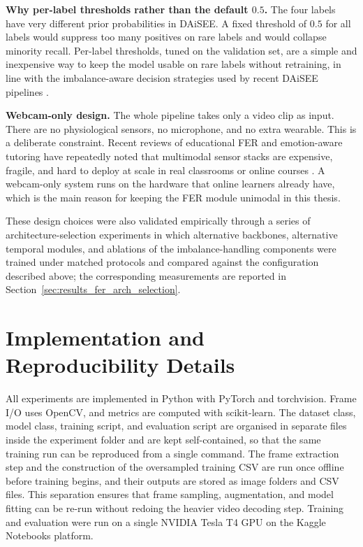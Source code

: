 \textbf{Why per-label thresholds rather than the default $0.5$.} The four labels have very different prior probabilities in DAiSEE. A fixed threshold of $0.5$ for all labels would suppress too many positives on rare labels and would collapse minority recall. Per-label thresholds, tuned on the validation set, are a simple and inexpensive way to keep the model usable on rare labels without retraining, in line with the imbalance-aware decision strategies used by recent DAiSEE pipelines \cite{rianto_engagement_2025,mehta_three-dimensional_2022}.

\textbf{Webcam-only design.} The whole pipeline takes only a video clip as input. There are no physiological sensors, no microphone, and no extra wearable. This is a deliberate constraint. Recent reviews of educational FER and emotion-aware tutoring have repeatedly noted that multimodal sensor stacks are expensive, fragile, and hard to deploy at scale in real classrooms or online courses \cite{vistorte_integrating_2024,fernandez-herrero_evaluating_2024,florestiyanto_emotion_2024}. A webcam-only system runs on the hardware that online learners already have, which is the main reason for keeping the FER module unimodal in this thesis.

These design choices were also validated empirically through a series of architecture-selection experiments in which alternative backbones, alternative temporal modules, and ablations of the imbalance-handling components were trained under matched protocols and compared against the configuration described above; the corresponding measurements are reported in Section~\ref{sec:results_fer_arch_selection}.

\section{Implementation and Reproducibility Details}\label{sec:method_reproducibility}

All experiments are implemented in Python with PyTorch and torchvision. Frame I/O uses OpenCV, and metrics are computed with scikit-learn. The dataset class, model class, training script, and evaluation script are organised in separate files inside the experiment folder and are kept self-contained, so that the same training run can be reproduced from a single command. The frame extraction step and the construction of the oversampled training CSV are run once offline before training begins, and their outputs are stored as image folders and CSV files. This separation ensures that frame sampling, augmentation, and model fitting can be re-run without redoing the heavier video decoding step. Training and evaluation were run on a single NVIDIA Tesla T4 GPU on the Kaggle Notebooks platform.

